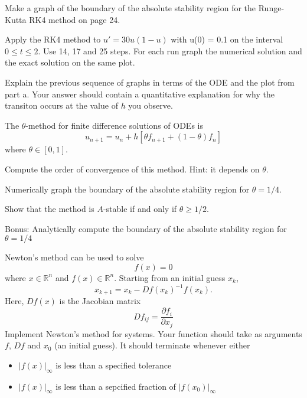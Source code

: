 \documentclass[minion]{homework}
\newcommand{\Reals}{\mathbb{R}}
\begin{document}
\begin{problems}

\problem 
\begin{subproblems}
\item
Make a graph of the boundary of the absolute stability
region for the Runge-Kutta RK4 method on page 24.

\item Apply the RK4 method to $u'=30u(1-u)$ with u(0) = 0.1 on the 
interval $0\le t\le 2$. Use 14, 17 and 25 steps. For each run
graph the numerical solution and 
the exact solution on the same plot. 

\item Explain the previous sequence of graphs in terms of the ODE and
the plot from part a.  Your answer should contain a quantitative explanation
for why the transiton occurs at the value of $h$ you observe.
\end{subproblems}

\problem The $\theta$-method for finite difference solutions of ODEs is
\[
u_{n+1} = u_n + h[\theta f_{n+1} + (1-\theta) f_n]
\]
where $\theta\in[0,1]$.
\begin{subproblems}
\item Compute the order of convergence of this method.  Hint:
it depends on $\theta$.
\item Numerically graph the boundary of the absolute stability region
for $\theta=1/4$.
\item Show that the method is $A$-stable if and only if $\theta\ge 1/2$.
\item Bonus: Analytically compute the boundary of the absolute
stability region for $\theta=1/4$
\end{subproblems}

\problem Newton's method can be used to solve
\[
f(x)=0
\]
where $x\in\Reals^n$ and $f(x)\in \Reals^n$.
Starting from an initial guess $x_k$,
\[
x_{k+1} = x_k - Df(x_k)^{-1} f(x_k).
\]
Here, $Df(x)$ is the Jacobian matrix
\[
Df_{ij} = \frac{\partial f_i}{\partial x_j}
\]
Implement Newton's method for systems.  Your
function should take as arguments $f$, $Df$
and $x_0$ (an initial guess).  It should terminate
whenever either 
\begin{itemize}
\item $|f(x)|_\infty$ is less than a specified tolerance
\item $|f(x)|_\infty$ is less than a sepcified fraction of $|f(x_0)|_\infty$
\end{itemize}


\end{problems}
\end{document}
